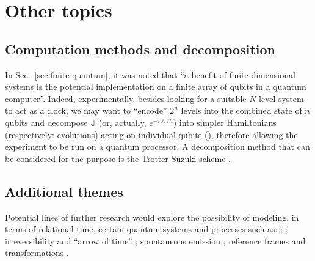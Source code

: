 \section{Other topics}\label{sec:outlook-misc}

\subsection{Computation methods and decomposition}

In Sec.~\ref{sec:finite-quantum}, it was noted that
``a benefit of finite-dimensional systems is the potential implementation on a finite array of
qubits in a quantum computer''.
Indeed,
experimentally,
besides looking for a suitable $N$-level system to act as a clock,
we may want to ``encode'' $2^{n}$ levels into the combined state of $n$
qubits and
decompose $\mathbb{J}$ (or, actually, $e^{-i\mathbb{J}\tau/\hbar}$)
into simpler Hamiltonians (respectively: evolutions)
acting on individual qubits (),
therefore allowing the experiment to be run on a quantum processor.
A decomposition method that can be considered for the purpose
is the Trotter-Suzuki scheme
\parencite{Trotter-Suzuki:exp, Trotter-Suzuki:GPU}.

\subsection{Additional themes}

Potential lines of further research would explore the possibility of modeling,
in terms of relational time,
certain quantum systems and processes such as:
%
 \parencite{crystal2,crystal3,crystal2012};
%
 \parencite{TQM1, TQM2};
%
irreversibility and ``arrow of time'' \parencite{Josset_Thermo};
%
spontaneous emission \parencite{Souza_Spontaneous};
%
reference frames and transformations \parencite{Adlam_ReferenceFrames}.
